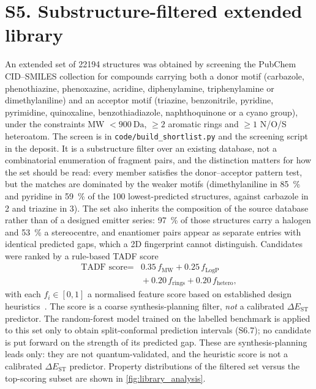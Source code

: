 \documentclass[final,3p,times,twocolumn]{elsarticle}
\makeatletter
\newcommand{\silabel}[2]{\phantomsection\protected@edef\@currentlabel{#1}\label{#2}}
\makeatother
\begin{document}
\section*{S5. Substructure-filtered extended library}\silabel{S5}{sec:library}
An extended set of \num{22194} structures was obtained by screening the PubChem
CID--SMILES collection for compounds carrying both a donor motif (carbazole,
phenothiazine, phenoxazine, acridine, diphenylamine, triphenylamine or dimethylaniline)
and an acceptor motif (triazine, benzonitrile, pyridine, pyrimidine, quinoxaline,
benzothiadiazole, naphthoquinone or a cyano group), under the constraints
MW $<\qty{900}{\dalton}$, $\geq 2$ aromatic rings and $\geq 1$ N/O/S heteroatom.
The screen is in \texttt{code/build\_shortlist.py} and the screening script in the deposit.
It is a substructure filter over an existing database, not a combinatorial enumeration
of fragment pairs, and the distinction matters for how the set should be read: every
member satisfies the donor--acceptor pattern test, but the matches are dominated by the
weaker motifs (dimethylaniline in \qty{85}{\percent} and pyridine in \qty{59}{\percent}
of the \num{100} lowest-predicted structures, against carbazole in \num{2} and triazine
in \num{3}). The set also inherits the composition of the source database rather than of
a designed emitter series: \qty{97}{\percent} of those structures carry a halogen and
\qty{53}{\percent} a stereocentre, and enantiomer pairs appear as separate entries with
identical predicted gaps, which a 2D fingerprint cannot distinguish. Candidates were
ranked by a rule-based TADF score
\begin{equation}
  \begin{aligned}
    \text{TADF score} ={}& 0.35\,f_\text{MW} + 0.25\,f_\text{LogP} \\
                    & {}+ 0.20\,f_\text{rings} + 0.20\,f_\text{hetero},
  \end{aligned}
  \label{eq:tadf_score}
\end{equation}
with each $f_i\in[0,1]$ a normalised feature score based on established design
heuristics~\cite{Liu2012,Uoyama2012,Wong2017}. The score is a coarse
synthesis-planning filter, \emph{not} a calibrated $\Delta E_\text{ST}$ predictor.
The random-forest model trained on the labelled benchmark is applied to this set only to
obtain split-conformal prediction intervals (S6.7); no candidate is put forward on the
strength of its predicted gap. These are
synthesis-planning leads only: they are not quantum-validated, and the heuristic
score is not a calibrated $\Delta E_\text{ST}$ predictor. Property distributions
of the filtered set versus the top-scoring subset are shown in
\cref{fig:library_analysis}.
\end{document}
